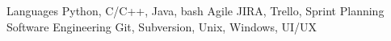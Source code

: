 
\begin{cvskills}

  \cvskill
    {Languages}
    {Python, C/C++, Java, bash}
  \cvskill
    {Agile} %
    {JIRA, Trello, Sprint Planning}
  \cvskill
    {Software Engineering}
    {Git, Subversion, Unix, Windows, UI/UX}

\end{cvskills}
